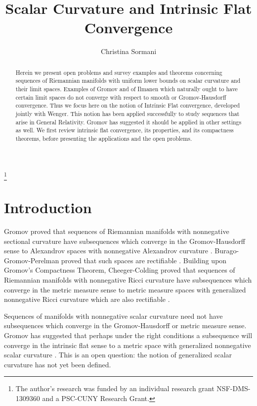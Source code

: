 \documentclass[12pt]{amsart}
\begin{document}
\title{Scalar Curvature and Intrinsic Flat Convergence}

\author{Christina Sormani}
\thanks{The author's research was funded by an individual research grant NSF-DMS-1309360 and a PSC-CUNY Research Grant.}

\address{CUNY Graduate Center and Lehman College}

\keywords{}

\begin{abstract}
Herein we present open problems and survey examples and theorems concerning sequences of Riemannian manifolds with uniform lower bounds on scalar curvature and their limit spaces.  Examples of Gromov and of Ilmanen which naturally ought to have certain limit spaces do not converge with respect to smooth or Gromov-Hausdorff
convergence.  Thus we focus here on the notion of Intrinsic Flat convergence,
developed jointly with Wenger.  This notion has been applied successfully to study sequences that arise in General Relativity.  Gromov has suggested it should be applied in other settings as well.   We first review intrinsic flat convergence, its properties, and its compactness theorems, before presenting the applications and the open problems.
\end{abstract}

\maketitle

\section{Introduction}

Gromov proved that
sequences of Riemannian manifolds with nonnegative sectional curvature
have subsequences which
converge in the Gromov-Hausdorff sense to Alexandrov spaces with nonnegative Alexandrov curvature \cite{Gromov-metric}.  Burago-Gromov-Perelman
proved that such spaces are rectifiable \cite{BGP}.  
Building upon Gromov's Compactness Theorem,
Cheeger-Colding proved that sequences of Riemannian manifolds 
with nonnegative Ricci curvature 
have subsequences which converge in the metric measure sense to 
metric measure spaces with generalized nonnegative Ricci curvature 
which are also rectifiable \cite{ChCo-PartI} \cite{Gromov-metric}.  

Sequences of manifolds with 
nonnegative scalar curvature need not have subsequences which converge 
in the Gromov-Hausdorff or metric measure sense.  Gromov has suggested that
perhaps under the right conditions
a subsequence will converge in the intrinsic flat sense to
a metric space with generalized nonnegative scalar curvature
\cite{Gromov-Plateau}.  This is an open question: the notion of generalized
scalar curvature has not yet been defined.  
\end{document}
